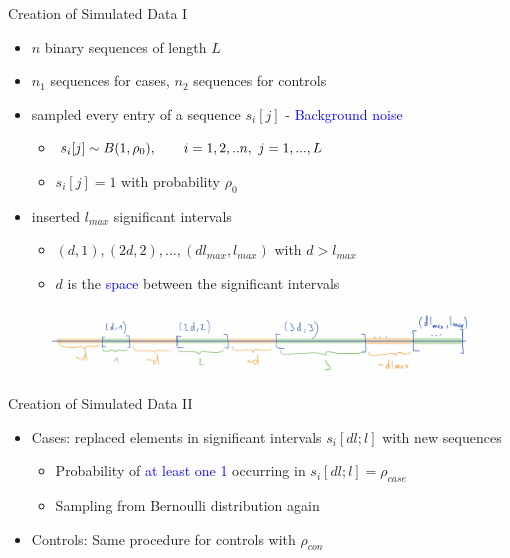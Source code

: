 \documentclass[aspectratio=32, 10pt]{beamer}
\begin{document}
\begin{frame}[fragile]{Creation of Simulated Data I}
\begin{itemize}
    \item $n$ binary sequences of length $L$
    \item $n_1$ sequences for cases, $n_2$ sequences for controls
    \item sampled every entry of a sequence $s_i[j]$  - \textcolor{blue}{Background noise}
    \begin{itemize}
        \item $s_i[j]\sim B(1,\rho_0), \hspace{20 pt} i= 1,2,..n,\  j= 1,...,L$
        \item $s_i[j] = 1$ with probability $\rho_0$
    \end{itemize}
    \item inserted $l_{max}$ significant intervals
    \begin{itemize}
        \item $(d,1), (2d,2), ..., (dl_{max}, l_{max})$ with $d>l_{max}$
        \item $d$ is the \textcolor{blue}{space} between the significant intervals
    \end{itemize}
\end{itemize}
\begin{figure}
    \centering
    \includegraphics[width=\textwidth]{figures/dl.png}
\end{figure}
\end{frame}

\begin{frame}[fragile]{Creation of Simulated Data II}
\begin{itemize}
    \item Cases: replaced elements in significant intervals $s_i[dl;l]$ with new sequences
    \begin{itemize}
        \item Probability of \textcolor{blue}{at least one 1} occurring in $s_i[dl;l] = \rho_{case}$ 
        \item Sampling from Bernoulli distribution again
    \end{itemize}
    \item Controls: Same procedure for controls with $\rho_{con}$
\end{itemize}
\end{frame}
\end{document}
